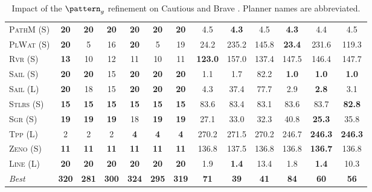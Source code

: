 \begin{table}[tb]
{\begin{tabular}{|l||cccccc||cccccc||}
\textsc{PathM} (S)&\textbf{20}&\textbf{20}&\textbf{20}&\textbf{20}&\textbf{20}&\textbf{20}&4.5&\textbf{4.3}&4.5&\textbf{4.3}&4.4&4.5\\
\textsc{PlWat} (S)&\textbf{20}&5&16&\textbf{20}&5&19&24.2&235.2&145.8&\textbf{23.4}&231.6&119.3\\
\textsc{Rvr} (S)&\textbf{13}&10&12&11&10&11&\textbf{123.0}&157.0&137.4&147.5&146.4&147.7\\
\textsc{Sail} (S)&\textbf{20}&\textbf{20}&15&\textbf{20}&\textbf{20}&\textbf{20}&1.1&1.7&82.2&\textbf{1.0}&\textbf{1.0}&\textbf{1.0}\\
\textsc{Sail} (L)&\textbf{20}&18&15&\textbf{20}&\textbf{20}&\textbf{20}&4.3&37.4&77.7&2.9&\textbf{2.8}&3.1\\
\textsc{Stlrs} (S)&\textbf{15}&\textbf{15}&\textbf{15}&\textbf{15}&\textbf{15}&\textbf{15}&83.6&83.4&83.1&83.6&83.7&\textbf{82.8}\\
\textsc{Sgr} (S)&\textbf{19}&\textbf{19}&\textbf{19}&18&\textbf{19}&\textbf{19}&27.1&33.0&32.3&40.8&\textbf{25.3}&35.8\\
\textsc{Tpp} (L)&2&2&2&\textbf{4}&\textbf{4}&\textbf{4}&270.2&271.5&270.2&246.7&\textbf{246.3}&\textbf{246.3}\\
\textsc{Zeno} (S)&\textbf{11}&\textbf{11}&\textbf{11}&\textbf{11}&\textbf{11}&\textbf{11}&136.8&137.5&136.8&136.8&\textbf{136.7}&136.8\\
\textsc{Line} (L)&\textbf{20}&\textbf{20}&\textbf{20}&\textbf{20}&\textbf{20}&\textbf{20}&1.9&\textbf{1.4}&13.4&1.8&\textbf{1.4}&10.3
\\\hline
\textit{Best}&\textbf{320}&\textbf{281}&\textbf{300}&\textbf{324}&\textbf{295}&\textbf{319}&\textbf{71}&\textbf{39}&\textbf{41}&\textbf{84}&\textbf{60}&\textbf{56}\\\hline

        \end{tabular}}
        \caption{Impact of the $\pattern_g$ refinement on Cautious and Brave \pattyd. Planner names are abbreviated.}
        \label{tab:abl-patterng}
        \end{table}
        